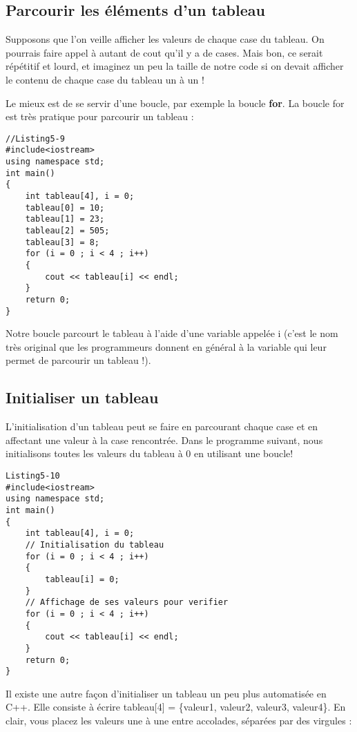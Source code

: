 \documentclass[a4paper, oneside,11pt]{book}
\begin{document}
\subsection{Parcourir les \'el\'ements d'un tableau}

Supposons que l'on veille afficher les valeurs de chaque case du tableau.
On pourrais faire appel \`a autant  de cout qu'il y a de cases. Mais bon, ce serait r\'ep\'etitif et lourd, et imaginez un peu la taille de notre code si on devait afficher 
le contenu de chaque case du tableau un \`a un !

Le mieux est de se servir d'une boucle, par exemple la boucle \textbf{for}. La boucle for est tr\`es pratique pour parcourir un tableau :

\begin{lstlisting}
//Listing5-9
#include<iostream>
using namespace std;
int main()
{
    int tableau[4], i = 0;
    tableau[0] = 10;
    tableau[1] = 23;
    tableau[2] = 505;
    tableau[3] = 8;
    for (i = 0 ; i < 4 ; i++)
    {
        cout << tableau[i] << endl;
    }
    return 0;
}
\end{lstlisting}

Notre boucle parcourt le tableau \`a l'aide d'une variable appel\'ee i (c'est le nom tr\`es original que les programmeurs donnent en g\'en\'eral \`a la variable qui leur permet de parcourir 
un tableau !).


\subsection{Initialiser un tableau}

L'initialisation d'un tableau peut se faire en parcourant chaque case et en affectant une valeur \`a la case rencontr\'ee. Dans le programme suivant, nous initialisons toutes les valeurs du tableau \`a 0 en utilisant une boucle!



\begin{lstlisting}
Listing5-10
#include<iostream>
using namespace std;
int main()
{
    int tableau[4], i = 0;
    // Initialisation du tableau
    for (i = 0 ; i < 4 ; i++)
    {
        tableau[i] = 0;
    }
    // Affichage de ses valeurs pour verifier
    for (i = 0 ; i < 4 ; i++)
    {
        cout << tableau[i] << endl;
    }
    return 0;
}
\end{lstlisting} 

Il existe une autre façon d'initialiser un tableau un peu plus automatis\'ee en C++.
Elle consiste \`a \'ecrire tableau[4] = \{valeur1, valeur2, valeur3, valeur4\}. En clair, vous placez les valeurs une \`a une entre accolades, s\'epar\'ees par des virgules :
\end{document}
